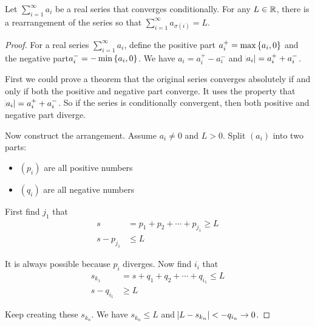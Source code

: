\begin{theorem}
    Let $\sum_{i=1}^\infty a_i$ be a real series that converges conditionally. For any $L \in \mathbb{R}$, there is a rearrangement of the series so that $\sum_{i=1}^\infty a_{\sigma (i)} = L$.
\end{theorem}
\begin{proof}
    For a real series $\sum_{i=1}^\infty a_i$, define the positive part $a^{+}_i = \max \set{a_i, 0}$ and the negative part$a_i^{-} = - \min \set{a_i, 0}$. We have $a_i = a_i^{+} - a_i^{-}$ and $\abs{a_i} = a_i^{+} + a_i^{-}$. 
    
    First we could prove a theorem that the original series converges absolutely if and only if both the positive and negative part converge. It uses the property that $\abs{a_i} = a_i^{+} + a_i^{-}$. So if the series is conditionally convergent, then both positive and negative part diverge.

    Now construct the arrangement. Assume $a_i \neq 0$ and $L > 0$. Split $(a_i)$ into two parts:
    \begin{itemize}
        \item $(p_i)$ are all positive numbers
        \item $(q_i)$ are all negative numbers
    \end{itemize}
    
    First find $j_1$ that
    \begin{equation*}
        \begin{aligned}
            s &= p_1 + p_2 + \cdots + p_{j_1} \geq L \\
            s - p_{j_1} &\leq L
        \end{aligned}
    \end{equation*}
    
    It is always possible because $p_i$ diverges. Now find $i_i$ that
    \begin{equation*}
        \begin{aligned}
            s_{k_1} &= s + q_1 + q_2 + \cdots + q_{i_1} \leq L \\
            s - q_{i_1} &\geq L
        \end{aligned}
    \end{equation*}
    
    Keep creating these $s_{k_n}$. We have $s_{k_n} \leq L$ and $\abs{L - s_{k_n}} < - q_{i_n} \rightarrow 0$.
\end{proof}





